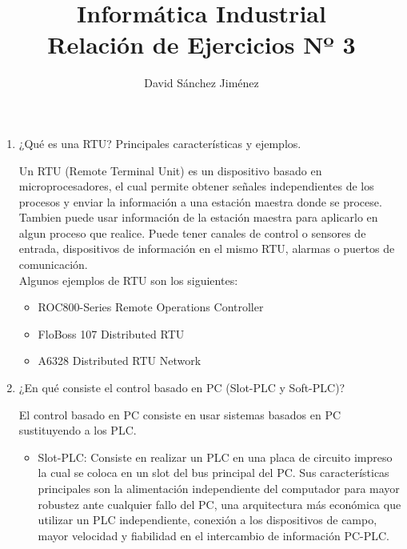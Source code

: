 \documentclass[10pt,a4paper,spanish]{article}
\begin{document}
  \setcounter{section}{0}
  \title{\huge\bf Informática Industrial \\ Relación de Ejercicios Nº 3}
  \author{\large David Sánchez Jiménez}
  \maketitle
  \vspace{3cm}

  \begin{enumerate}
    \item ¿Qué es una RTU? Principales características y ejemplos.

    \noindent
    Un RTU (Remote Terminal Unit) es un dispositivo basado en microprocesadores, el cual permite obtener señales independientes de los procesos y enviar la información a una estación maestra donde se procese. Tambien puede usar información de la estación maestra para aplicarlo en algun proceso que realice. Puede tener canales de control o sensores de entrada, dispositivos de información en el mismo RTU, alarmas o puertos de comunicación. \\

    \noindent
    Algunos ejemplos de RTU son los siguientes:
    \begin{itemize}
      \item ROC800-Series Remote Operations Controller
      \item FloBoss 107 Distributed RTU
      \item A6328 Distributed RTU Network


    \end{itemize}

    \item ¿En qué consiste el control basado en PC (Slot-PLC y Soft-PLC)?

    \noindent
    El control basado en PC consiste en usar sistemas basados en PC sustituyendo a los PLC.

    \begin{itemize}
      \item Slot-PLC: Consiste en realizar un PLC en una placa de circuito impreso la cual se coloca en un slot del bus principal del PC. Sus características principales son la alimentación independiente del computador para mayor robustez ante cualquier fallo del PC, una arquitectura más económica que utilizar un PLC independiente, conexión a los dispositivos de campo, mayor velocidad y fiabilidad en el intercambio de información PC-PLC.


\end{itemize}
\end{enumerate}
\end{document}

